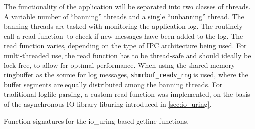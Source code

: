 The functionality of the application will be separated into two classes of threads. A variable number of ``banning'' threads
and a single ``unbanning'' thread. The banning threads are tasked with monitoring the application log. The routinely call a read
function, to check if new messages have been added to the log. The read function varies, depending on the type of \ac{IPC} architecture
being used. For multi-threaded use, the read function has to be thread-safe and should ideally be lock free, to allow for optimal performance.
When using the shared memory ringbuffer as the source for log messages, \texttt{shmrbuf\_readv\_rng} is used, where the buffer segments
are equally distributed among the banning threads. For traditional logfile parsing, a custom read function was implemented, on the
basis of the asynchronous \ac{IO} library liburing introduced in \ref{sec:io_uring}.

\begin{algorithm}[h!]
    
    \label{alg:uring_getline}
    \caption[Asynchronous Getline Function]{Function signatures for the io\_uring based getline functions.}
\end{algorithm}

